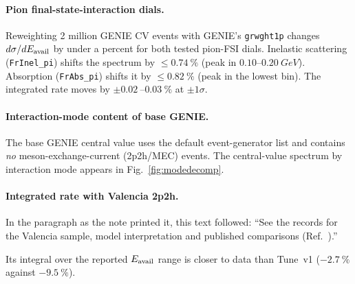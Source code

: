 \paragraph{Pion final-state-interaction dials.} Reweighting 2 million GENIE CV events with GENIE's \texttt{grwght1p} changes $d\sigma/dE_{\mathrm{avail}}$ by under a percent for both tested pion-FSI dials. Inelastic scattering (\texttt{FrInel\_pi}) shifts the spectrum by $\le\SI{0.74}{\percent}$ (peak in $0.10$--$\SI{0.20}{GeV}$). Absorption (\texttt{FrAbs\_pi}) shifts it by $\le\SI{0.82}{\percent}$ (peak in the lowest bin). The integrated rate moves by $\pm\SI{0.02}{}$--$\SI{0.03}{\percent}$ at $\pm1\sigma$.

\paragraph{Interaction-mode content of base GENIE.} The base GENIE central value uses the default event-generator list and contains \emph{no} meson-exchange-current (2p2h/MEC) events. The central-value spectrum by interaction mode appears in Fig.~\ref{fig:modedecomp}.

\paragraph{Integrated rate with Valencia 2p2h.} In the paragraph as the note printed it, this text followed: ``See the records for the Valencia sample, model interpretation and published comparisons (Ref.~\cite{NoteRecords2026}).''\par Its integral over the reported $E_{\mathrm{avail}}$ range is closer to data than Tune~v1 ($-\SI{2.7}{\percent}$ against $-\SI{9.5}{\percent}$).

